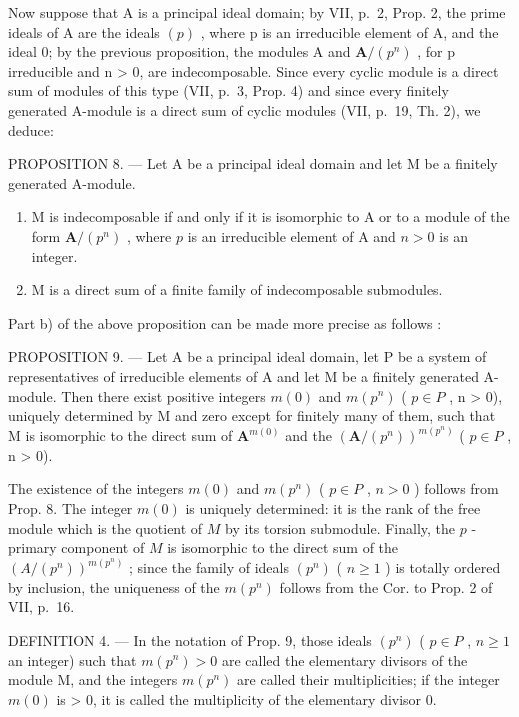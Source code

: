 Now suppose that A is a principal ideal domain; by VII, p.~2, Prop. 2, the prime ideals of A are the ideals \((p)\) , where p is an irreducible element of A, and the ideal 0; by the previous proposition, the modules A and \(\mathbf{A}/(p^{n})\) , for p irreducible and n \textgreater{} 0, are indecomposable. Since every cyclic module is a direct sum of modules of this type (VII, p.~3, Prop. 4) and since every finitely generated A-module is a direct sum of cyclic modules (VII, p.~19, Th. 2), we deduce:

PROPOSITION 8. --- Let A be a principal ideal domain and let M be a finitely generated A-module.

\begin{enumerate}
\def\labelenumi{\alph{enumi})}
\item
  M is indecomposable if and only if it is isomorphic to A or to a module of the form \(\mathbf{A} / (p^n)\) , where \(p\) is an irreducible element of A and \(n > 0\) is an integer.
\item
  M is a direct sum of a finite family of indecomposable submodules.
\end{enumerate}

Part b) of the above proposition can be made more precise as follows :

PROPOSITION 9. --- Let A be a principal ideal domain, let P be a system of representatives of irreducible elements of A and let M be a finitely generated A-module. Then there exist positive integers \(m(0)\) and \(m(p^{n})\) ( \(p \in P\) , n \textgreater{} 0), uniquely determined by M and zero except for finitely many of them, such that M is isomorphic to the direct sum of \(\mathbf{A}^{m(0)}\) and the \((\mathbf{A}/(p^{n}))^{m(p^{n})}\) ( \(p \in P\) , n \textgreater{} 0).

The existence of the integers \(m(0)\) and \(m(p^n)\) ( \(p \in P\) , \(n > 0\) ) follows from Prop. 8. The integer \(m(0)\) is uniquely determined: it is the rank of the free module which is the quotient of \(M\) by its torsion submodule. Finally, the \(p\) -primary component of \(M\) is isomorphic to the direct sum of the \((A/(p^n))^{m(p^n)}\) ; since the family of ideals \((p^n)\) ( \(n \geqslant 1\) ) is totally ordered by inclusion, the uniqueness of the \(m(p^n)\) follows from the Cor. to Prop. 2 of VII, p.~16.

DEFINITION 4. --- In the notation of Prop. 9, those ideals \((p^{n})\) ( \(p \in P\) , \(n \geqslant 1\) an integer) such that \(m(p^{n}) > 0\) are called the elementary divisors of the module M, and the integers \(m(p^{n})\) are called their multiplicities; if the integer \(m(0)\) is \textgreater{} 0, it is called the multiplicity of the elementary divisor 0.

